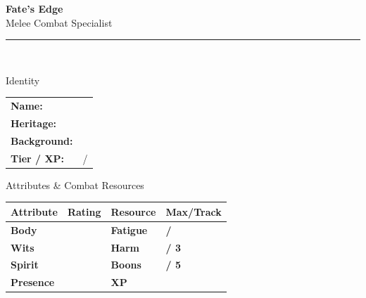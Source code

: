 \documentclass[10pt]{article}
\begin{document}
\begin{center}
    {\Huge\bfseries\sffamily\color{edgered} Fate's Edge}\\[0.2em]
    {\large\sffamily Melee Combat Specialist}\\[0.5em]
    \rule{0.5\textwidth}{0.5pt}\\[1em]
\end{center}

\begin{minipage}[t]{0.48\linewidth}
    \begin{charbox}{Identity}
        \begin{tabular}{p{2.5cm} p{5cm}}
            \textbf{Name:} & \underline{\hspace{4cm}} \\
            \textbf{Heritage:} & \underline{\hspace{4cm}} \\
            \textbf{Background:} & \underline{\hspace{4cm}} \\
            \textbf{Tier / XP:} & \underline{\hspace{2cm}} / \underline{\hspace{2cm}} \\
        \end{tabular}
    \end{charbox}
    
    \vspace{0.5em}
    
    \begin{charbox}{Attributes \& Combat Resources}
        \begin{tabular}{>{\bfseries}p{2.5cm} >{\bfseries}p{1.5cm} >{\bfseries}p{2.5cm} >{\bfseries}p{1.5cm}}
            \toprule
            \textbf{Attribute} & \textbf{Rating} & \textbf{Resource} & \textbf{Max/Track} \\
            \midrule
            Body & \underline{\hspace{1.5cm}} & Fatigue & \underline{\hspace{1.5cm}} / \underline{\hspace{1.5cm}} \\
            Wits & \underline{\hspace{1.5cm}} & Harm & \underline{\hspace{1.5cm}} / 3 \\
            Spirit & \underline{\hspace{1.5cm}} & Boons & \underline{\hspace{1.5cm}} / 5 \\
            Presence & \underline{\hspace{1.5cm}} & XP & \underline{\hspace{1.5cm}} \\
            \bottomrule
        \end{tabular}
    \end{charbox}
    

\end{minipage}
\end{document}
